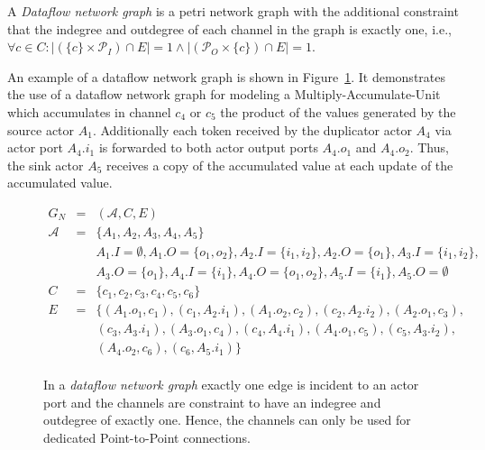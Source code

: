 \begin{definition}\label{dataflow-network-graph}
  A \emph{Dataflow network graph} is a petri network graph with the additional constraint
  that the indegree and outdegree of each channel in the graph is exactly one, i.e.,
  $\forall{c \in C}: |(\{c\} \times \mathcal{P}_I) \cap E| = 1 \wedge
                    |(\mathcal{P}_O \times \{c\}) \cap E| = 1$.
\end{definition}

  An example of a dataflow network graph is shown in Figure~\ref{fig:ng-dataflow}.
  It demonstrates the use of a dataflow network graph for modeling
  a Multiply-Accumulate-Unit which accumulates in channel $c_4$ or $c_5$ the product of
  the values generated by the source actor $A_1$.
  Additionally each token received by the duplicator actor $A_4$ via actor port $A_4.i_1$
  is forwarded to both actor output ports $A_4.o_1$ and $A_4.o_2$.
  Thus, the sink actor $A_5$ receives a copy of the accumulated value at
  each update of the accumulated value.

\begin{figure}
\centering

\begin{displaymath}
\begin{array}{rcl}
  G_N & = & (\mathcal{A},C,E) \\
  \mathcal{A} & = & \{A_1,A_2,A_3,A_4,A_5\} \\
      &   & A_1.I = \emptyset, A_1.O=\{o_1,o_2\}, A_2.I = \{i_1,i_2\}, A_2.O=\{o_1\},A_3.I = \{i_1,i_2\},\\
      &   & A_3.O=\{o_1\},A_4.I = \{i_1\}, A_4.O=\{o_1,o_2\}, A_5.I = \{i_1\}, A_5.O=\emptyset \\
  C   & = & \{c_1,c_2,c_3,c_4,c_5,c_6\} \\
  E   & = & \{(A_1.o_1,c_1),(c_1,A_2.i_1),(A_1.o_2,c_2),(c_2,A_2.i_2),(A_2.o_1,c_3),\\
      &   &   (c_3,A_3.i_1),(A_3.o_1,c_4),(c_4,A_4.i_1),(A_4.o_1,c_5),(c_5,A_3.i_2),\\
      &   &   (A_4.o_2,c_6),(c_6,A_5.i_1)\} \\
\end{array}
\end{displaymath}
\caption{\label{fig:ng-dataflow} In a \emph{dataflow network graph} exactly
  one edge is incident to an actor port and the channels are
  constraint to have an indegree and outdegree of exactly one.
  Hence, the channels can only be used for dedicated
  Point-to-Point connections.}
\end{figure}

